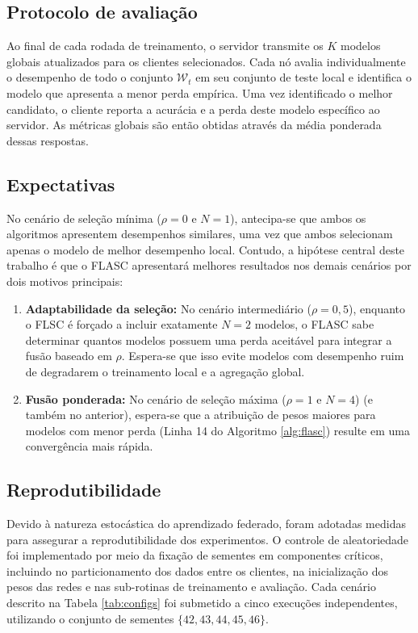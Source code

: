 \subsection{Protocolo de avaliação}

Ao final de cada rodada de treinamento, o servidor transmite os $K$ modelos globais atualizados para os clientes selecionados.
Cada nó avalia individualmente o desempenho de todo o conjunto $\mathcal{W}_t$ em seu conjunto de teste local
e identifica o modelo que apresenta a menor perda empírica.
Uma vez identificado o melhor candidato, o cliente reporta a acurácia e a perda deste modelo específico ao servidor.
As métricas globais são então obtidas através da média ponderada dessas respostas.

\subsection{Expectativas}

No cenário de seleção mínima ($\rho = 0$ e $N = 1$), antecipa-se que ambos os algoritmos apresentem desempenhos similares,
uma vez que ambos selecionam apenas o modelo de melhor desempenho local.
Contudo, a hipótese central deste trabalho é que o FLASC apresentará melhores resultados nos demais cenários por dois motivos principais:
\begin{enumerate}
    \item \textbf{Adaptabilidade da seleção:} No cenário intermediário ($\rho=0,5$), enquanto o FLSC é forçado a incluir exatamente $N=2$ modelos,
    o FLASC sabe determinar quantos modelos possuem uma perda aceitável para integrar a fusão baseado em $\rho$.
    Espera-se que isso evite modelos com desempenho ruim de degradarem o treinamento local e a agregação global. 
    \item \textbf{Fusão ponderada:} No cenário de seleção máxima ($\rho=1$ e $N=4$) (e também no anterior),
    espera-se que a atribuição de pesos maiores para modelos com menor perda (Linha 14 do Algoritmo \ref{alg:flasc})
    resulte em uma convergência mais rápida.
\end{enumerate}

\subsection{Reprodutibilidade}

Devido à natureza estocástica do aprendizado federado,
foram adotadas medidas para assegurar a reprodutibilidade dos experimentos.
O controle de aleatoriedade foi implementado por meio da fixação de sementes em componentes críticos,
incluindo no particionamento dos dados entre os clientes,
na inicialização dos pesos das redes e nas sub-rotinas de treinamento e avaliação.
Cada cenário descrito na Tabela \ref{tab:configs} foi submetido a cinco execuções independentes,
utilizando o conjunto de sementes $\{42, 43, 44, 45, 46\}$.
